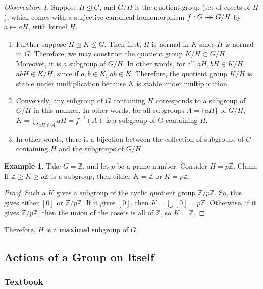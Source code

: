 \documentclass[12pt]{article}
\theoremstyle{definition}
\newtheorem{eg}[thm]{Example}
\theoremstyle{remark}
\newtheorem{obs}[thm]{Observation}
\numberwithin{equation}{section}
\newcommand\Z{\mathbb Z}    %
\newcommand\B[1]{\textbf{ #1}}
\newcommand\nsub{\trianglelefteq}
\newcommand{\surrightarrow}{\rightarrow\mathrel{\mkern-14mu}\rightarrow}
\begin{document}
\begin{obs}
        Suppose $H \nsub G$, and $G/H$ is the quotient group (set of cosets of $H$), which comes with a surjective canonical homomorphism $f:G \surrightarrow G/H$ by $a \mapsto aH$, with kernel $H$. \begin{enumerate}
                \item Further suppose $H \nsub K \leq G$. Then first, $H$ is normal in $K$ since $H$ is normal in $G$. Therefore, we may construct the quotient group $K/H \subset G/H$. Moreover, it is a subgroup of $G/H$. In other words, for all $aH,bH \in K/H$, $abH \in K/H$, since if $a,b \in K$, $ab \in K$. Therefore, the quotient group $K/H$ is stable under multiplication because $K$ is stable under multiplication.
                \item Conversely, any subgroup of $G$ containing $H$ corresponds to a subgroup of $G/H$ in this manner. In other words, for all subgroups $A = \{aH\}$ of $G/H$, $K = \bigcup_{aH \in A}aH = f^{-1}(A)$ is a subgroup of G containing $H$.
                \item In other words, there is a bijection between the collection of subgroups of $G$ containing $H$ and the subgroups of $G/H$.
        \end{enumerate}
\end{obs}
\begin{eg}
        Take $G = \Z$, and let $p$ be a prime number. Consider $H = p\Z$. Claim: If $\Z \geq K \geq p\Z$ is a subgroup, then either $K = \Z$ or $K = p\Z$.
        
        \begin{proof}
                Such a $K$ gives a subgroup of the cyclic quotient group $\Z/p\Z$. So, this gives either $[0]$ or $\Z/p\Z$. If it gives $[0]$, then $K = \bigcup [0] = p\Z$. Otherwise, if it gives $\Z/p\Z$, then the union of the cosets is all of $\Z$, so $K = \Z$. 
        \end{proof}

        Therefore, $H$ is a \B{maximal} subgroup of $G$.
\end{eg}


\vspace{15pt}

\subsection{Actions of a Group on Itself}


\subsubsection{Textbook}
\end{document}
